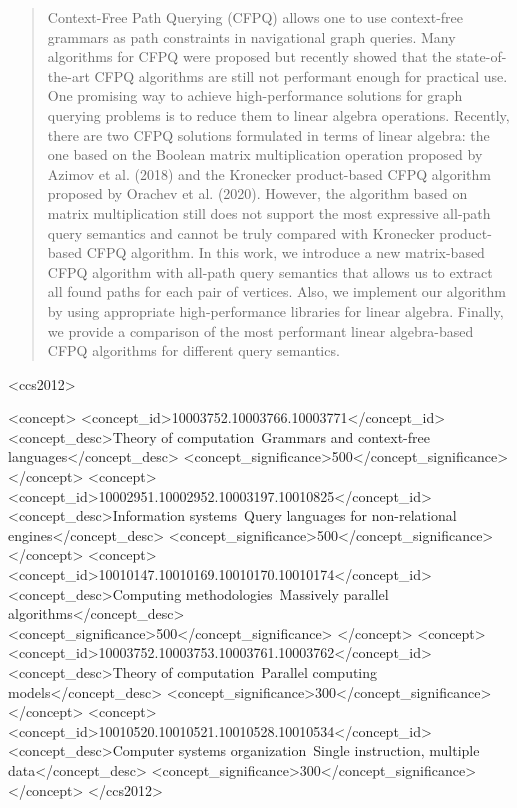 \documentclass[sigconf,table,10pt,anonymous]{acmart}
\begin{document}
	\begin{abstract}
		Context-Free Path Querying (CFPQ) allows one to use context-free grammars as path constraints in navigational graph queries. Many algorithms for CFPQ were proposed but recently showed that the state-of-the-art CFPQ algorithms are still not performant enough for practical use. One promising way to achieve high-performance solutions for graph querying problems is to reduce them to linear algebra operations. Recently, there are two CFPQ solutions formulated in terms of linear algebra: the one based on the Boolean matrix multiplication operation proposed by Azimov et al. (2018) and the Kronecker product-based CFPQ algorithm proposed by Orachev et al. (2020). However, the algorithm based on matrix multiplication still does not support the most expressive all-path query semantics and cannot be truly compared with Kronecker product-based CFPQ algorithm. In this work, we introduce a new matrix-based CFPQ algorithm with all-path query semantics that allows us to extract all found paths for each pair of vertices. Also, we implement our algorithm by using appropriate high-performance libraries for linear algebra. Finally, we provide a comparison of the most performant linear algebra-based CFPQ algorithms for different query semantics.
	\end{abstract}
	
	\begin{CCSXML}
		<ccs2012>
		
		<concept>
		<concept_id>10003752.10003766.10003771</concept_id>
		<concept_desc>Theory of computation~Grammars and context-free languages</concept_desc>
		<concept_significance>500</concept_significance>
		</concept>
		<concept>
		<concept_id>10002951.10002952.10003197.10010825</concept_id>
		<concept_desc>Information systems~Query languages for non-relational engines</concept_desc>
		<concept_significance>500</concept_significance>
		</concept>
		<concept>
		<concept_id>10010147.10010169.10010170.10010174</concept_id>
		<concept_desc>Computing methodologies~Massively parallel algorithms</concept_desc>
		<concept_significance>500</concept_significance>
		</concept>
		<concept>
		<concept_id>10003752.10003753.10003761.10003762</concept_id>
		<concept_desc>Theory of computation~Parallel computing models</concept_desc>
		<concept_significance>300</concept_significance>
		</concept>
		<concept>
		<concept_id>10010520.10010521.10010528.10010534</concept_id>
		<concept_desc>Computer systems organization~Single instruction, multiple data</concept_desc>
		<concept_significance>300</concept_significance>
		</concept>
		</ccs2012>
	\end{CCSXML}
	
\end{document}
